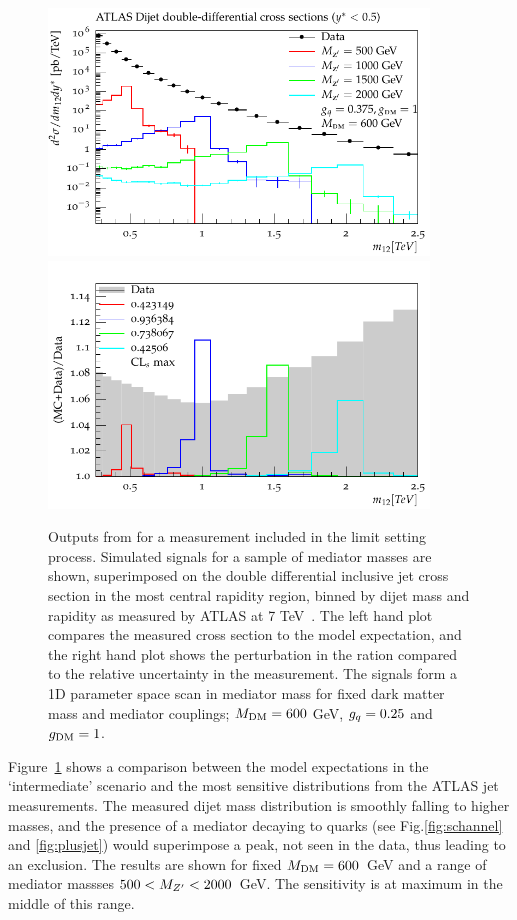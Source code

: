 \documentclass[floatfix]{article}
\begin{document}
\begin{figure}[htb]
\centering
      \includegraphics[width=0.9\textwidth]{images/atlasdijet/fullscale/ATLAS_dijet.pdf}\\
      \includegraphics[width=0.9\textwidth]{images/atlasdijet/ratio/ATLAS_dijet_ratio.pdf}
    \caption{ Outputs from \rivet for a measurement included in the limit setting process. Simulated signals for a sample of mediator masses are shown, superimposed 
on the double differential inclusive jet cross section in the most central rapidity region, binned by dijet mass and rapidity as measured by ATLAS at 
7 TeV~\cite{Aad:2014pua}. The left hand plot compares the measured cross section to the model expectation, and the right hand plot shows the perturbation 
in the ration compared to the relative uncertainty in the measurement. 
The signals form a 1D parameter space scan in mediator mass for fixed dark matter mass and mediator couplings; $M_{\rm DM}=600$ GeV, 
$g_{q}=0.25$ and $g_{\rm DM} = 1$.}
\label{fig:ATLASdijet}
\end{figure}

Figure~\ref{fig:ATLASdijet} shows a comparison between the model expectations in the `intermediate' scenario and the most sensitive distributions from the ATLAS jet measurements. The measured dijet mass distribution is smoothly falling to higher masses, and the presence of a mediator decaying to quarks 
(see Fig.\ref{fig:schannel} and \ref{fig:plusjet}) would superimpose a
peak, not seen in the data, thus leading to an exclusion. The results are shown for fixed $M_{\rm DM} = 600$~GeV and a range of mediator massses $500 < M_{Z^{\prime}} < 2000$~GeV. 
The sensitivity is at maximum in the middle of this range.
\end{document}
